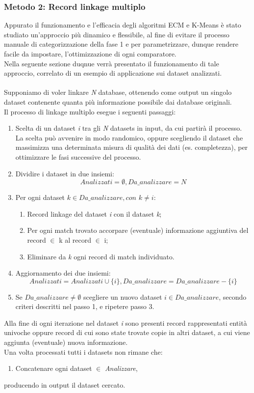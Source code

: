\documentclass[a4paper,12pt]{article}
\begin{document}
\subsubsection{Metodo 2: Record linkage multiplo}
Appurato il funzionamento e l'efficacia degli algoritmi ECM e K-Means è stato studiato un'approccio più dinamico e flessibile, al fine di evitare il processo manuale di categorizzazione della fase 1 e per parametrizzare, dunque rendere facile da impostare, l'ottimizzazione di ogni comparatore.\\
Nella seguente sezione duqnue verrà presentato il funzionamento di tale approccio, correlato di un esempio di applicazione sui dataset analizzati.\\\\
Supponiamo di voler linkare \textit{N} database, ottenendo come output un singolo dataset contenente quanta più informazione possibile dai database originali.\\
Il processo di linkage multiplo esegue i seguenti passaggi:

\begin{enumerate}
	\item Scelta di un dataset \textit{i} tra gli \textit{N} datasets in input, da cui partirà il processo. La scelta può avvenire in modo randomico, oppure scegliendo il dataset che massimizza una determinata misura di qualità dei dati (es. completezza), per ottimizzare le fasi successive del processo.
	\item Dividire i dataset in due insiemi: \[Analizzati = \emptyset, Da\_analizzare = N\]
	\item Per ogni dataset \textit{$k \in Da\_analizzare, con$ $k \neq i$}:
	\begin{enumerate}
		\item Record linkage del dataset \textit{i} con il dataset \textit{k};
		\item Per ogni match trovato accorpare (eventuale) informazione aggiuntiva del record $\in$ k al record $\in$ i;
		\item Eliminare da \textit{k} ogni record di match individuato.
	\end{enumerate}
	\item Aggiornamento dei due insiemi: \[Analizzati = Analizzati \cup \{i\}, Da\_analizzare = Da\_analizzare - \{i\}\]
	\item Se \(Da\_analizzare \neq \emptyset\) scegliere un nuovo dataset \(i \in Da\_analizzare\), secondo criteri descritti nel passo 1, e ripetere passo 3.
\end{enumerate}
Alla fine di ogni iterazione nel dataset \textit{i} sono presenti record rappresentati entità univoche oppure record di cui sono state trovate copie in altri dataset, a cui viene aggiunta (eventuale) nuova informazione.\\Una volta processati tutti i datasets non rimane che:
\begin{enumerate}[resume]
	\item Concatenare ogni dataset $\in$ \textit{Analizzare},
\end{enumerate}
producendo in output il dataset cercato.
\end{document}
